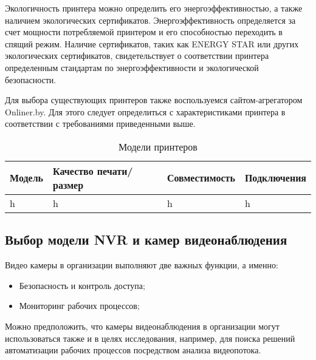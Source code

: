 Экологичность принтера можно определить его энергоэффективностью, а также наличием экологических сертификатов. 
Энергоэффективность определяется за счет мощности потребляемой принтером и его способностью переходить в спящий режим. 
Наличие сертификатов, таких как ENERGY STAR или других экологических сертификатов, свидетельствует о соответствии принтера 
определенным стандартам по энергоэффективности и экологической безопасности.

Для выбора существующих принтеров также воспользуемся сайтом-агрегатором Onliner.by. Для этого следует определиться с характеристиками
принтера в соответствии с требованиями приведенными выше.

\begin{table}[ht]
    \caption{Модели принтеров}
    \label{table:func:printersList}
    \begin{tabular}{| >{\raggedright}m{}
                    | >{\raggedright\arraybackslash}m{}
                    | >{\raggedright\arraybackslash}m{}
                    | >{\raggedright\arraybackslash}m{}|}
        \hline
        \centering Модель
        & \centering\arraybackslash Качество печати/размер
        & \centering\arraybackslash Совместимость 
        & \centering\arraybackslash Подключения \\

        \hline
        h & h & h & h
        \\
        
        \hline
    \end{tabular}
\end{table}

\subsection{Выбор модели NVR и камер видеонаблюдения}

Видео камеры в организации выполняют две важных функции, а именно:
\begin{itemize}
    \item Безопасность и контроль доступа;
    \item Мониторинг рабочих процессов;
\end{itemize}

Можно предположить, что камеры видеонаблюдения в организации могут использоваться также и в целях исследования, например, для 
поиска решений автоматизации рабочих процессов посредством анализа видеопотока.

